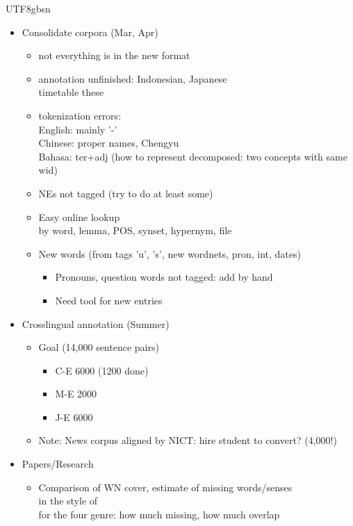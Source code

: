 \documentclass[12pt]{book} %
\begin{document}
\begin{CJK}{UTF8}{gbsn}
\begin{itemize}
\item Consolidate corpora (Mar, Apr)
  \begin{itemize}
  \item not everything is in the new format
  \item annotation unfinished: Indonesian, Japanese
    \\ timetable these
  \item tokenization errors: 
    \\ English: mainly '-'
    \\ Chinese: proper names, Chengyu
    \\ Bahasa: ter+adj (how to represent decomposed: two concepts with same wid)
  \item NEs not tagged (try to do at least some)
  \item Easy online lookup
    \\ by word, lemma, POS, synset, hypernym, file
  \item New words (from tags 'u', 's', new wordnets, pron, int, dates)
    \begin{itemize}
    \item Pronouns, question words not tagged:   add by hand
    \item Need tool for new entries
    \end{itemize}
  \end{itemize}
\item Crosslingual annotation (Summer)
  \begin{itemize}
  \item Goal (14,000 sentence pairs)
    \begin{itemize}
    \item C-E 6000 (1200 done)
    \item M-E 2000
    \item J-E 6000
    \end{itemize}
  \item Note: News corpus aligned by NICT: hire student to convert? (4,000!)
  \end{itemize}
\item Papers/Research
  \begin{itemize}
  \item  Comparison of WN cover, estimate of missing words/senses
    \\ in the style of \citet{Baldwin:Bender:Flickinger:Kim:Oepen:2004}
    \\ for the four genre: how much missing, how much overlap

\end{itemize}
\end{itemize}
\end{CJK}
\end{document}
